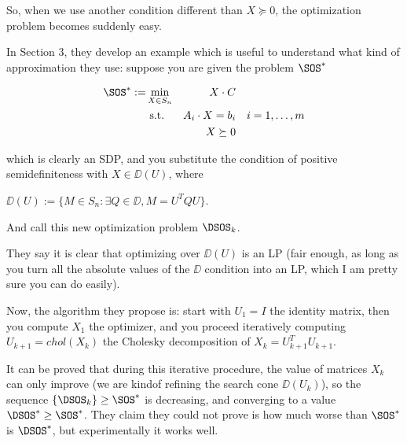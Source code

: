 So, when we use another condition different than $X\succeq 0$, the optimization problem becomes suddenly easy.

In Section 3, they develop an example which is useful to understand what kind of approximation they use: suppose you are given the problem $\SOS^*$

\begin{align}
	\SOS^* := & \min_{X\in S_n} & X \cdot C & \\
	& \text{ s.t. } & A_i \cdot X = b_i & & i=1,\dots,m \\
	& & X\succeq 0 & \\
\end{align}

which is clearly an SDP, and you substitute the condition of positive semidefiniteness with $X\in\DD(U)$, where 
\begin{definition}
	$\DD(U) := \{M\in S_n: \exists Q\in\DD, M=U^T Q U\}$.
\end{definition}

And call this new optimization problem $\DSOS_k$.

They say it is clear that optimizing over $\DD(U)$ is an LP (fair enough, as long as you turn all the absolute values of the $\DD$ condition into an LP, which I am pretty sure you can do easily).

Now, the algorithm they propose is: start with $U_1=I$ the identity matrix, then you compute $X_1$ the optimizer, and you proceed iteratively computing $U_{k+1} = chol(X_k)$ the Cholesky decomposition of $X_k=U_{k+1}^T U_{k+1}$.

It can be proved that during this iterative procedure, the value of matrices $X_k$ can only improve (we are kindof refining the search cone $\DD(U_k)$), so the sequence $\{\DSOS_k\} \geq \SOS^*$ is decreasing, and converging to a value $\DSOS^*\geq \SOS^*$. They claim they could not prove is how much worse than $\SOS^*$ is $\DSOS^*$, but experimentally it works well.

